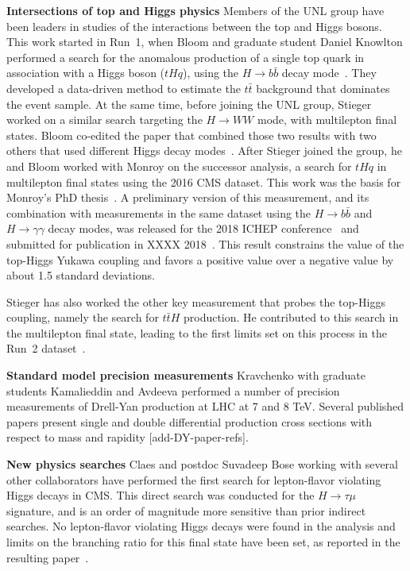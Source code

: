 {\bf Intersections of top and Higgs physics} Members of the UNL group have
been leaders in studies of the interactions between the top and Higgs
bosons.  This work started in Run~1, when Bloom and graduate student Daniel
Knowlton performed a search for the anomalous production of a single top
quark in association with a Higgs boson ($tHq$), using the $H \to b\bar{b}$
decay mode~\cite{bib:tHqbbPAS}.  They developed a data-driven method to
estimate the $t\bar{t}$ background that dominates the event sample.  At the
same time, before joining the UNL group, Stieger worked on a similar search
targeting the $H \to WW$ mode, with multilepton final states.  Bloom
co-edited the paper that combined those two results with two others that
used different Higgs decay modes~\cite{bib:tHqRun1}.  After Stieger joined
the group, he and Bloom worked with Monroy on the successor analysis, a
search for $tHq$ in multilepton final states using the 2016 CMS dataset.
This work was the basis for Monroy's PhD thesis~\cite{bib:monroy_thesis}.  A preliminary version of
this measurement, and its combination with measurements in the same dataset
using the $H\to b\bar{b}$ and $H \to \gamma\gamma$ decay modes, was
released for the 2018 ICHEP conference~\cite{bib:tHqRun2PAS} and submitted
for publication in XXXX 2018~\cite{bib:tHqRun2}.  This result constrains
the value of the top-Higgs Yukawa coupling and favors a positive value over
a negative value by about 1.5 standard deviations.

Stieger has also worked the other key measurement that probes the top-Higgs
coupling, namely the search for $t\bar{t}H$ production.  He contributed to
this search in the multilepton final state, leading to the first limits set
on this process in the Run~2 dataset~\cite{bib:ttHmultilep}.

{\bf Standard model precision measurements} Kravchenko with graduate students Kamalieddin and Avdeeva performed a number of precision measurements of Drell-Yan production at LHC at 7 and 8 TeV. Several published papers present single and double differential production cross sections with respect to mass and rapidity [add-DY-paper-refs].

{\bf New physics searches}
Claes and postdoc Suvadeep Bose working with several other collaborators have performed the first search for lepton-flavor violating Higgs decays in CMS. This direct search was conducted for the $H\rightarrow \tau\mu$ signature, and is an order of magnitude more sensitive than prior indirect searches. No lepton-flavor violating Higgs decays were found in the analysis and limits on the branching ratio for this final state have been set, as reported in the resulting paper~\cite{bib:higgs-LFV}.

